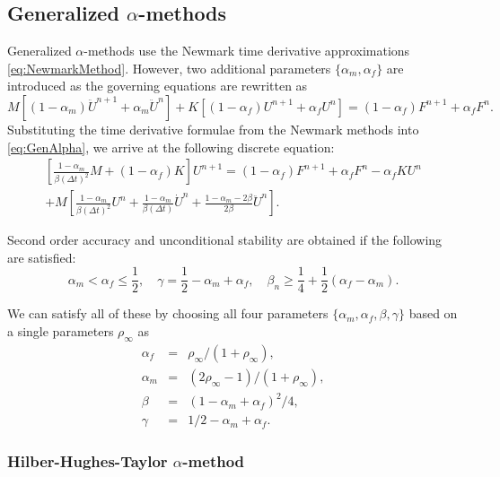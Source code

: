 \documentclass[12pt]{article}
\begin{document}
\subsection{Generalized $\alpha$-methods}

Generalized $\alpha$-methods \cite{Chung1993} use the Newmark time derivative approximations \eqref{eq:NewmarkMethod}.
However, two additional parameters $\{\alpha_m, \alpha_f\}$ are introduced as 
the governing equations are rewritten as
\begin{equation}
\label{eq:GenAlpha}
M \left[ (1-\alpha_m) \ddot{U}^{n+1} + \alpha_m \ddot{U}^n \right]
+ K \left[ (1-\alpha_f) {U}^{n+1} + \alpha_f {U}^n\right]
= (1-\alpha_f)F^{n+1} + \alpha_f F^n.
\end{equation}
%
Substituting the time derivative formulae from the Newmark methods into \eqref{eq:GenAlpha},
we arrive at the following discrete equation:
\begin{multline}
\left[  \frac{1-\alpha_m}{\beta (\Delta t)^2} M + (1-\alpha_f)K \right] U^{n+1} =
(1-\alpha_f)F^{n+1} + \alpha_f F^n - \alpha_f K U^n
\\
+ M\left[ \frac{1-\alpha_m}{\beta (\Delta t)^2} U^n 
+ \frac{1-\alpha_m}{\beta (\Delta t)} \dot{U}^n
+  \frac{1-\alpha_m - 2\beta}{2\beta} \ddot{U}^n
\right].
\end{multline}


Second order accuracy and unconditional stability are obtained
if the following are satisfied:
\begin{equation}
\alpha_m<\alpha_f\le \frac{1}{2}, 
\quad 
\gamma = \frac{1}{2} - \alpha_m + \alpha_f,
\quad
\beta_n \ge \frac{1}{4} + \frac{1}{2}(\alpha_f - \alpha_m).
\end{equation}

We can satisfy all of these by choosing all four parameters
$\{\alpha_m, \alpha_f, \beta, \gamma\}$ based on a single
parameters $\rho_\infty$ as
\begin{eqnarray}
\alpha_f &=& \rho_\infty/(1+\rho_\infty),
\\
\alpha_m &=& (2\rho_\infty-1)/(1+\rho_\infty),
\\
\beta &=& (1-\alpha_m+\alpha_f)^2/4,
\\
\gamma &=& 1/2 - \alpha_m + \alpha_f.
\end{eqnarray}

\subsubsection{Hilber-Hughes-Taylor $\alpha$-method}
\end{document}
